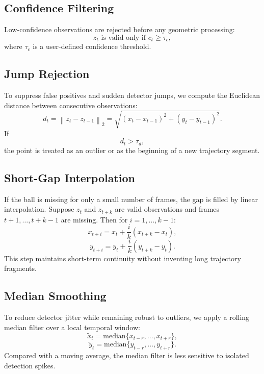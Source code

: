 \documentclass[11pt]{article}
\begin{document}
\subsection{Confidence Filtering}
Low-confidence observations are rejected before any geometric processing:
\begin{equation}
    z_t \text{ is valid only if } c_t \ge \tau_c,
\end{equation}
where $\tau_c$ is a user-defined confidence threshold.

\subsection{Jump Rejection}
To suppress false positives and sudden detector jumps, we compute the Euclidean distance between consecutive observations:
\begin{equation}
    d_t = \left\| z_t - z_{t-1} \right\|_2
    = \sqrt{(x_t-x_{t-1})^2 + (y_t-y_{t-1})^2}.
\end{equation}
If
\begin{equation}
    d_t > \tau_d,
\end{equation}
the point is treated as an outlier or as the beginning of a new trajectory segment.

\subsection{Short-Gap Interpolation}
If the ball is missing for only a small number of frames, the gap is filled by linear interpolation. Suppose $z_t$ and $z_{t+k}$ are valid observations and frames $t+1,\dots,t+k-1$ are missing. Then for $i=1,\dots,k-1$:
\begin{equation}
    x_{t+i} = x_t + \frac{i}{k}(x_{t+k}-x_t),
\end{equation}
\begin{equation}
    y_{t+i} = y_t + \frac{i}{k}(y_{t+k}-y_t).
\end{equation}
This step maintains short-term continuity without inventing long trajectory fragments.

\subsection{Median Smoothing}
To reduce detector jitter while remaining robust to outliers, we apply a rolling median filter over a local temporal window:
\begin{equation}
    \tilde{x}_t = \mathrm{median}\{x_{t-r}, \dots, x_{t+r}\},
\end{equation}
\begin{equation}
    \tilde{y}_t = \mathrm{median}\{y_{t-r}, \dots, y_{t+r}\}.
\end{equation}
Compared with a moving average, the median filter is less sensitive to isolated detection spikes.
\end{document}
